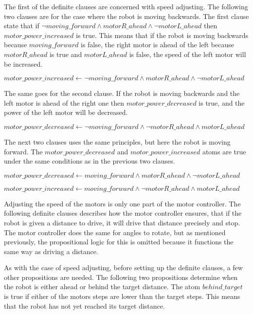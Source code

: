 The first of the definite clauses are concerned with speed adjusting. The following two clauses are for the case where the robot is moving backwards. The first clause state that if $\lnot moving\_forward \land motorR\_ahead \land \lnot motorL\_ahead$ then $motor\_power\_increased$ is true. This means that if the robot is moving backwards because $moving\_forward$ is false, the right motor is ahead of the left because $motorR\_ahead$ is true and $motorL\_ahead$ is false, the speed of the left motor will be increased.

\hspace{3mm} $motor\_power\_increased \leftarrow \lnot moving\_forward \land motorR\_ahead \land \lnot motorL\_ahead$ 

The same goes for the second clause. If the robot is moving backwards and the left motor is ahead of the right one then $motor\_power\_decreased$ is true, and the power of the left motor will be decreased.

\hspace{3mm} $motor\_power\_decreased \leftarrow \lnot moving\_forward \land \lnot motorR\_ahead \land motorL\_ahead$

The next two clauses uses the same principles, but here the robot is moving forward. The $motor\_power\_decreased$ and $motor\_power\_increased$ atoms are true under the same conditions as in the previous two clauses.

\hspace{3mm} $motor\_power\_decreased \leftarrow moving\_forward \land motorR\_ahead \land \lnot motorL\_ahead$

\hspace{3mm} $motor\_power\_increased \leftarrow moving\_forward \land \lnot motorR\_ahead \land motorL\_ahead$


Adjusting the speed of the motors is only one part of the motor controller. The following definite clauses describes how the motor controller ensures, that if the robot is given a distance to drive, it will drive that distance precisely and stop. The motor controller does the same for angles to rotate, but as mentioned previously, the propositional logic for this is omitted because it functions the same way as driving a distance.

As with the case of speed adjusting, before setting up the definite clauses, a few other propositions are needed. The following two propositions determine when the robot is either ahead or behind the target distance. The atom $behind\_target$ is true if either of the motors steps are lower than the target steps. This means that the robot has not yet reached its target distance.

